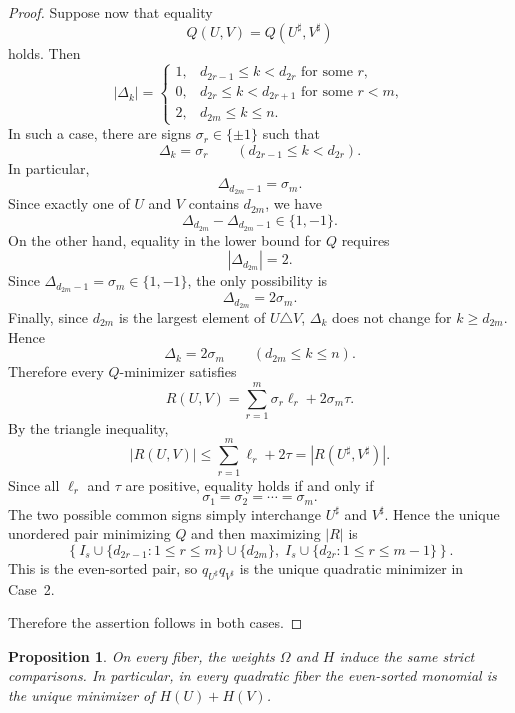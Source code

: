\documentclass[11pt]{amsart}
\newtheorem{proposition}[theorem]{Proposition}
\theoremstyle{definition}
\numberwithin{equation}{section}
\begin{document}
\begin{proof}
Suppose now that equality 
\[
Q(U,V)=Q(U^\sharp,V^\sharp)
\]
holds.
Then 
\[
 |\Delta_k|=
 \begin{cases}
1, & d_{2r-1}\le k<d_{2r}
    \text{ for some }r,\\
0, & d_{2r}\le k<d_{2r+1}
    \text{ for some }r<m,\\
2, & d_{2m}\le k\le n.
 \end{cases}
\]
In such a case,
there are signs $\sigma_r\in\{\pm1\}$
such that
\[
 \Delta_k=\sigma_r
 \qquad
(d_{2r-1}\le k<d_{2r}).
\]
In particular,
$$
 \Delta_{d_{2m}-1}=\sigma_m.
$$
Since exactly one of \(U\) and \(V\) contains \(d_{2m}\), 
we have
$$
 \Delta_{d_{2m}}-\Delta_{d_{2m}-1}\in\{1,-1\}.
$$
On the other hand, equality in the lower bound for \(Q\) requires
$$
 |\Delta_{d_{2m}}|=2.
$$
Since \(\Delta_{d_{2m}-1}=\sigma_m\in\{1,-1\}\), the only possibility is
$$
 \Delta_{d_{2m}}=2\sigma_m.
$$
Finally, since \(d_{2m}\) is the largest element of \(U\triangle V\), \(\Delta_k\) does not change for \(k\ge d_{2m}\). Hence
$$
 \Delta_k=2\sigma_m
 \qquad
 (d_{2m}\le k\le n).
$$
Therefore every \(Q\)-minimizer satisfies
\[
R(U,V) =
 \sum_{r=1}^m\sigma_r\ell_r
+ 2\sigma_m\tau.
\]
By the triangle inequality,
\[
|R(U,V)|
 \le
 \sum_{r=1}^m\ell_r+2\tau
= |R(U^\sharp,V^\sharp)|.
\]
Since all \(\ell_r\) and \(\tau\) are positive, equality holds if and only if
\[
 \sigma_1=\sigma_2=\cdots=\sigma_m.
\]
The two possible common signs simply interchange
\(U^\sharp\) and \(V^\sharp\).
Hence the unique unordered pair minimizing $Q$ and then maximizing $|R|$ is
\[
 \left\{
 I_s\cup\{d_{2r-1}:1\le r\le m\}\cup\{d_{2m}\},
 \;
 I_s\cup\{d_{2r}:1\le r\le m-1\}
\right\}.
\]
This is the even-sorted pair, so $q_{U^\sharp}q_{V^\sharp}$ is the unique quadratic minimizer in Case~2.

\medskip

Therefore the assertion follows in both cases.
\end{proof}

\begin{proposition}\label{prop:Hcomparison}
On every fiber, the weights $\Omega$ and $H$ induce the same strict comparisons. In particular, in every quadratic fiber the even-sorted monomial is the unique minimizer of $H(U)+H(V)$.
\end{proposition}
\end{document}
